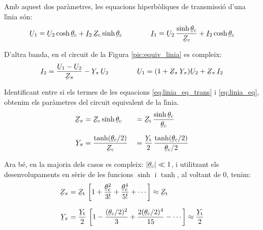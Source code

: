 Amb aquest dos par\`{a}metres, les equacions hiperb\`{o}liques de
transmissi\'{o} d'una l\'{\i}nia s\'{o}n: 
\begin{equation}\label{eq:linia_eq_trans}
   \cmplx{U}_1 = \cmplx{U}_2 \cosh \cmplx{\theta}\ped{c}  + \cmplx{I}_2 \,\cmplx{Z}\ped{c} \sinh \cmplx{\theta}\ped{c}   \qquad \qquad
   \cmplx{I}_1 = \cmplx{U}_2 \, \frac{\sinh \cmplx{\theta}\ped{c}}{\cmplx{Z}\ped{c}}  +   \cmplx{I}_2 \cosh \cmplx{\theta}\ped{c}
\end{equation}

D'altra banda, en el circuit de la Figura \vref{pic:equiv_linia} es compleix:
\begin{equation}\label{eq:linia_eq}
   \cmplx{I}_2 = \frac{\cmplx{U}_1 - \cmplx{U}_2}{\cmplx{Z}_\pi} - \cmplx{Y}_\pi\, \cmplx{U}_2
   \qquad \qquad
   \cmplx{U}_1 = (1 + \cmplx{Z}_\pi\,\cmplx{Y}_\pi ) \cmplx{U}_2 + \cmplx{Z}_\pi\,\cmplx{I}_2
\end{equation}

Identificant entre si els termes de les equacions
\eqref{eq:linia_eq_trans} i \eqref{eq:linia_eq}, obtenim els
par\`{a}metres del circuit equivalent de la l\'{\i}nia. 
\begin{alignat}{2}
   \cmplx{Z}_\pi &= \cmplx{Z}\ped{c} \sinh \cmplx{\theta}\ped{c} &&= \cmplx{Z}\ped{t} \,
   \frac{\sinh \cmplx{\theta}\ped{c}}{\cmplx{\theta}\ped{c}} \\[1.5ex]
   \cmplx{Y}_\pi &= \frac{\tanh (\cmplx{\theta}\ped{c} / 2) }{\cmplx{Z}\ped{c}} &&=
   \frac{\cmplx{Y}\ped{t}}{2} \, \frac{\tanh (\cmplx{\theta}\ped{c} / 2)}{\cmplx{\theta}\ped{c} / 2}
\end{alignat}

Ara b\'{e}, en la majoria dels casos es compleix: $|\cmplx{\theta}\ped{c}| \ll 1$, i utilitzant els desenvolupaments en s\`{e}rie de les funcions $\sinh$ i $\tanh$, al voltant de 0, tenim:
\begin{align}
   \cmplx{Z}_\pi &= \cmplx{Z}\ped{t} \, \left[ 1 + \frac{\cmplx{\theta}\ped{c}^2}{3!} +
   \frac{\cmplx{\theta}\ped{c}^4}{5!} + \cdots \right] \approx \cmplx{Z}\ped{t} \\[1.5ex]
   \cmplx{Y}_\pi &= \frac{\cmplx{Y}\ped{t}}{2} \,\left[ 1 - \frac{(\cmplx{\theta}\ped{c}/2)^2}{3} + \frac{2 (\cmplx{\theta}\ped{c}/2)^4}{15} - \cdots \right] \approx \frac{\cmplx{Y}\ped{t}}{2}
\end{align}

